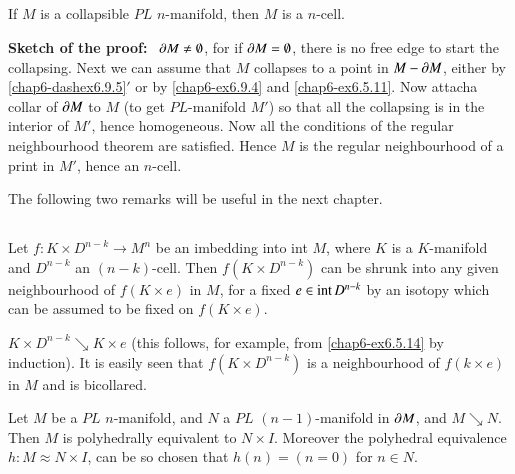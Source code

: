 \setcounter{subsection}{5}
\subsection{}\label{chap6-sec6.9.6}
If $M$ is a collapsible $PL$ $n$-manifold, then $M$ is a $n$-cell.

\medskip
\noindent
{\bf Sketch of the proof:}~ $\partial M\neq \emptyset$, for if $\partial M=\emptyset$, there is no free edge to start the collapsing. Next we can assume that $M$ collapses to a point in $M-\partial M$, either by \ref{chap6-dashex6.9.5}$'$ or by \ref{chap6-ex6.9.4} and \ref{chap6-ex6.5.11}. Now attach\pageoriginale a collar of $\partial M$ to $M$ (to get $PL$-manifold $M'$) so that all the collapsing is in the interior of $M'$, hence homogeneous. Now all the conditions of the regular neighbourhood theorem are satisfied. Hence $M$ is the regular neighbourhood of a print in $M'$, hence an $n$-cell.

The following two remarks will be useful in the next chapter.

\subsection{}\label{chap-sec6.9.7}
Let $f:K\times D^{n-k}\to M^{n}$ be an imbedding into int $M$, where $K$ is a $K$-manifold and $D^{n-k}$ an $(n-k)$-cell. Then $f(K\times D^{n-k})$ can be shrunk into any given neighbourhood of $f(K\times e)$ in $M$, for a fixed $e\in \text{int\,}D^{n-k}$ by an isotopy which can be assumed to be fixed on $f(K\times e)$.

$K\times D^{n-k}\searrow K\times e$ (this follows, for example, from \ref{chap6-ex6.5.14} by induction). It is easily seen that $f(K\times D^{n-k})$ is a neighbourhood of $f(k\times e)$ in $M$ and is bicollared.

\setcounter{proposition}{7}
\begin{proposition}\label{chap6-prop6.9.8}
Let $M$ be a $PL$ $n$-manifold, and $N$ a $PL$ $(n-1)$-manifold in $\partial M$, and $M\searrow N$. Then $M$ is polyhedrally equivalent to $N\times I$. Moreover the polyhedral equivalence $h:M\approx N\times I$, can be so chosen that $h(n)=(n=0)$ for $n\in N$. 
\end{proposition}

